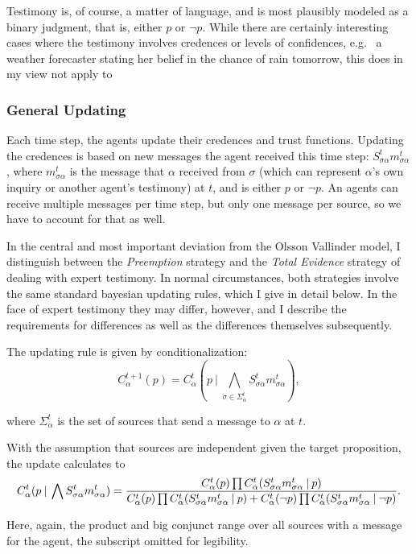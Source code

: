 \documentclass[11pt, a4paper]{scrartcl}
\newcommand{\Stsa}{S^t_{\sigma\alpha}}
\newcommand{\sa}{{\sigma\alpha}}
\newcommand{\given}[1][]{\:#1\vert\:}
\newcommand{\Sm}{\Stsa{}m^t_{\sa}}
\renewcommand{\i}[1]{\emph{#1}}
\renewcommand{\a}{\alpha}
\begin{document}
Testimony is, of course, a matter of language, and is most plausibly modeled as a binary judgment, that is, either $p$ or $\neg p$. While there are certainly interesting cases where the testimony involves credences or levels of confidences, e.g. \ a weather forecaster stating her belief in the chance of rain tomorrow, this does in my view not apply to  

\subsubsection{General Updating}

Each time step, the agents update their credences and trust functions. Updating the credences is based on new messages the agent received this time step: $\Stsa m^t_{\sa}$, where $m^t_{\sa}$ is the message that $\alpha$ received from $\sigma$ (which can represent $\alpha$'s own inquiry or another agent's testimony) at $t$, and is either $p$ or $\neg p$. An agents can receive multiple messages per time step, but only one message per source, so we have to account for that as well. 

In the central and most important deviation from the Olsson Vallinder model, I distinguish between the \i{Preemption} strategy and the \i{Total Evidence} strategy of dealing with expert testimony. In normal circumstances, both strategies involve the same standard bayesian updating rules, which I give in detail below. In the face of expert testimony they may differ, however, and I describe the requirements for differences as well as the differences themselves subsequently. 

The updating rule is given by conditionalization:
\[
    C^{t+1}_\alpha (p) = C^t_\alpha (p \given \bigwedge_{\sigma \in \Sigma^t_\alpha} \Stsa m^t_{\sa}),
\]

where $\Sigma^t_\alpha$ is the set of sources that send a message to $\alpha$ at $t$.

With the assumption that sources are independent given the target proposition, the update calculates to
\begin{equation}
    \label{eq:upd}
    C^t_\a (p \given \bigwedge \Sm) = \\
     \frac{C^t_\a (p) \prod C^t_\a (\Sm \given p) }
    {C^t_\a (p) \prod C^t_\a (\Sm \given p) +  C^t_\a (\neg p) \prod C^t_\a (\Sm \given \neg p) }.
\end{equation}

Here, again, the product and big conjunct range over all sources with a message for the agent, the subscript omitted for legibility.   
\end{document}

